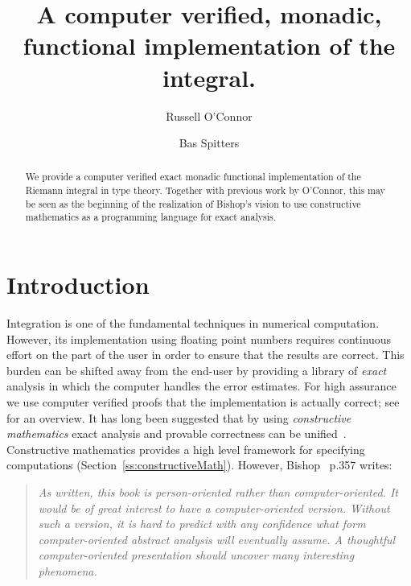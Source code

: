 \documentclass{elsarticle}
\newcommand{\tmem}[1]{{\em #1\/}}
\begin{document}
\title{A computer verified, monadic, functional implementation of the integral.}


\author[ru]{Russell O'Connor}
\author[ru]{Bas Spitters}
\address[ru]{Radboud University Nijmegen}
\begin{abstract}
  We provide a computer verified exact monadic functional implementation of
  the Riemann integral in type theory. Together with previous work by
  O'Connor, this may be seen as the beginning of the realization of Bishop's
  vision to use constructive mathematics as a programming language for exact
  analysis.
\end{abstract}
\maketitle
\section{Introduction}
Integration is one of the fundamental techniques in numerical computation.
However, its implementation using floating point numbers requires continuous
effort on the part of the user in order to ensure that the results are
correct. This burden can be shifted away from the end-user by providing a
library of {\tmem{exact}} analysis in which the computer handles the error
estimates. For high assurance we use computer verified proofs that the
implementation is actually correct; see~{\cite{typesreal-article}} for an
overview. It has long been suggested that by using {\tmem{constructive
mathematics}} exact analysis and provable correctness can be
unified~{\cite{Bishop67,Bishop:num}}. Constructive mathematics provides a high
level framework for specifying computations
(Section~\ref{ss:constructiveMath}). However, Bishop~{\cite{Bishop67}} p.357
writes:

\begin{quotation}
  {\tmem{As written, this book is person-oriented rather than
  computer-oriented. It would be of great interest to have a computer-oriented
  version. Without such a version, it is hard to predict with any confidence
  what form computer-oriented abstract analysis will eventually assume. A
  thoughtful computer-oriented presentation should uncover many interesting
  phenomena.}}
\end{quotation}
\end{document}
